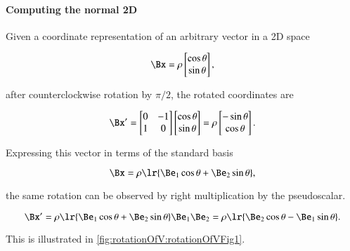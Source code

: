 \paragraph{Computing the normal 2D}

Given a coordinate representation of an arbitrary vector in a 2D space

\begin{dmath}\label{eqn:SimpleProducts2:240}
   \Bx = \rho
\begin{bmatrix}
   \cos\theta \\
   \sin\theta \\
\end{bmatrix},
\end{dmath}

after counterclockwise rotation by \( \pi/2 \), the rotated coordinates are

\begin{dmath}\label{eqn:SimpleProducts2:260}
\Bx'
=
\begin{bmatrix}
   0 & -1 \\
   1 & 0 \\
\end{bmatrix}
\begin{bmatrix}
   \cos\theta \\
   \sin\theta \\
\end{bmatrix}
=
\rho
\begin{bmatrix}
   -\sin\theta \\
   \cos\theta
\end{bmatrix}.
\end{dmath}

Expressing this vector in terms of the standard basis

\begin{dmath}\label{eqn:SimpleProducts2:280}
   \Bx = \rho \lr{ \Be_1 \cos\theta + \Be_2 \sin\theta },
\end{dmath}

the same rotation can be observed by right multiplication by the pseudoscalar.

\begin{dmath}\label{eqn:SimpleProducts2:300}
\Bx'
= \rho \lr{ \Be_1 \cos\theta + \Be_2 \sin\theta } \Be_1 \Be_2
= \rho \lr{ \Be_2 \cos\theta - \Be_1 \sin\theta }.
\end{dmath}

This is illustrated in \cref{fig:rotationOfV:rotationOfVFig1}.

